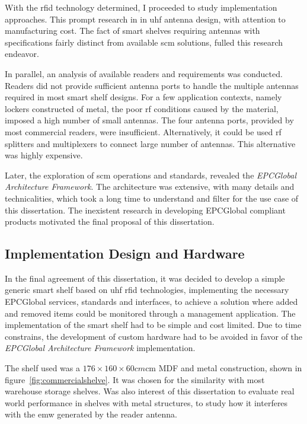 With the \ac{rfid} technology determined, I proceeded to study implementation approaches. This prompt research in in \ac{uhf} antenna design, with attention to manufacturing cost. The fact of smart shelves requiring antennas with specifications fairly distinct from available \ac{scm} solutions, fulled this research endeavor.

In parallel, an analysis of available readers and requirements was conducted.
Readers did not provide sufficient antenna ports to handle the multiple antennas required in most smart shelf designs.
For a few application contexts, namely lockers constructed of metal, the poor \ac{rf} conditions caused by the material, imposed a high number of small antennas. The four antenna ports, provided by most commercial readers, were insufficient. 
Alternatively, it could be used \ac{rf} splitters and multiplexers to connect large number of antennas. This alternative was highly expensive.

Later, the exploration of \ac{scm} operations and standards, revealed the \emph{EPCGlobal Architecture Framework}. The architecture was extensive, with many details and technicalities, which took a long time to understand and filter for the use case of this dissertation.
The inexistent research in developing EPCGlobal compliant products motivated the final proposal of this dissertation.

\subsection{Implementation Design and Hardware}

In the final agreement of this dissertation, it was decided to develop a simple generic smart shelf based on \ac{uhf} \ac{rfid} technologies, implementing the necessary EPCGlobal services, standards and interfaces, to achieve a solution where added and removed items could be monitored through a management application.
The implementation of the smart shelf had to be simple and cost limited. 
Due to time constrains, the development of custom hardware had to be avoided in favor of the \emph{EPCGlobal Architecture Framework} implementation.

The shelf used was a $176\times160\times60cm$cm MDF and metal construction, shown in figure~\ref{fig:commercialshelve}. It was chosen for the similarity with most warehouse storage shelves. Was also interest of this dissertation to evaluate real world performance in shelves with metal structures, to study how it interferes with the \ac{emw} generated by the reader antenna.

